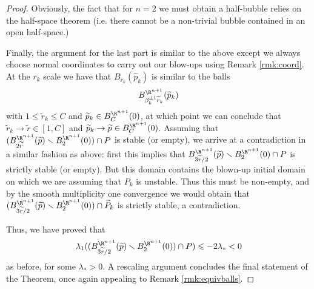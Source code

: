 \begin{proof}
        	 		Obviously, the fact that for $n=2$ we must obtain a half-bubble relies on the half-space theorem \cite{HM90} (i.e. there cannot be a non-trivial bubble contained in an open half-space.)
        	 		
        	 		Finally, the argument for the last part is similar to the above except we always choose normal coordinates to carry out our blow-ups using Remark \ref{rmk:coord}. At the $r_k$ scale we have that $B_{\widehat{r}_k}(\widehat{p}_k)$ is similar to the balls 
        	 		$$B^{\R^{n+1}}_{\beta_k^{\pm 1}\widetilde{r}_k}(\widetilde{p}_k)$$ with $1\leqslant \widetilde{r}_k \leqslant C$ and $\widetilde{p}_k\in B^{\R^{n+1}}_C(0)$, at which point we can conclude that $\widetilde{r}_k \to \widetilde{r}\in [1,C]$ and $\widetilde{p}_k \to \widetilde{p}\in B^{\R^{n+1}}_C(0)$.    
        	 		Assuming that $(B^{\R^{n+1}}_{2\widetilde{r}}(\widetilde{p})\smallsetminus B^{\R^{n+1}}_2(0))\cap P$ is stable (or empty), we arrive at a contradiction in a similar fashion as above: first this implies that $B_{3\widetilde{r}/2}^{\R^{n+1}}(\widetilde{p})\smallsetminus B_2^{\R^{n+1}}(0)\cap P$ is strictly stable (or empty). But this domain contains the blown-up initial domain on which we are assuming that $P_k$ is unstable. Thus this must be non-empty, and by the smooth multiplicity one convergence we would obtain that $(B_{3\widetilde{r}/2}^{\R^{n+1}}(\widetilde{p})\smallsetminus B_2^{\R^{n+1}}(0))\cap \widetilde{P}_k$ is strictly stable, a contradiction. 
        	 		
        	 		Thus, we have proved that $$\lambda_1 ((B^{\R^{n+1}}_{3\widetilde{r}/2}(\widetilde{p})\smallsetminus B^{\R^{n+1}}_2(0))\cap P)\leqslant -2\lambda_{\ast}<0 $$ as before, for some $\lambda_{\ast}>0$. A rescaling argument concludes the final statement of the Theorem, once again appealing to Remark \ref{rmk:equivballs}.         
        	 \end{proof}
